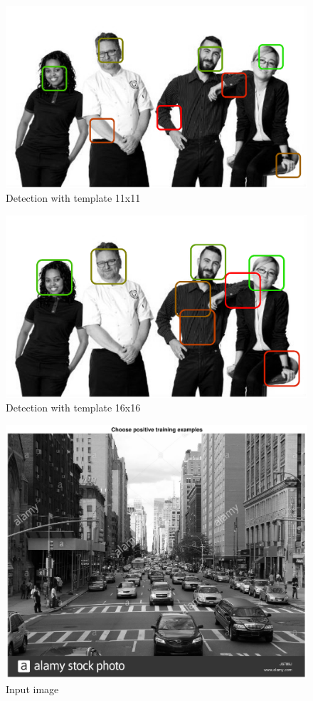 \documentclass{article}
\newcommand{\tl}[1]{\textlatin{#1}}
\begin{document}
	\begin{figure}[H]
		\centering
		\includegraphics[scale=0.5]{res/result.eps}
		\caption{\tl{Detection with template 11x11}}
		\label{fig:3}
	\end{figure}

	\begin{figure}[H]
		\centering
		\includegraphics[scale=0.5]{res/template_size_16.eps}
		\caption{\tl{Detection with template 16x16}}
		\label{fig:4}
	\end{figure}
	
	\begin{figure}[H]
		\centering
		\includegraphics[scale=0.4]{res/car_15_11_input.eps}
		\caption{\tl{Input image}}
		\label{fig:5}
	\end{figure}%
\end{document}
